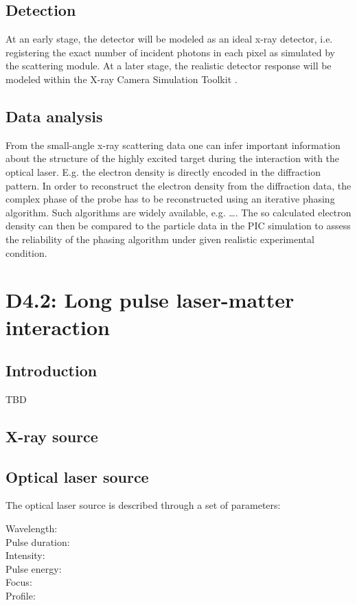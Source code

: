 \documentclass[a4paper]{article}
\begin{document}
\subsection{Detection}
At an early stage, the detector will be modeled as an ideal x-ray detector, i.e. registering the exact number of incident photons in each
pixel as simulated by the scattering module. At a later stage, the realistic detector response will be modeled within the
X-ray Camera Simulation Toolkit \cite{Joy2015}.%
%
\subsection{Data analysis}
From the small-angle x-ray scattering data one can infer important information about the structure of the highly excited target during
the interaction with the optical laser. E.g. the electron density is directly encoded in the diffraction pattern. In order to
reconstruct the electron density from the diffraction data, the complex phase of the probe has to be reconstructed using an iterative phasing
algorithm. Such algorithms are widely available, e.g. \ldots {}.
The so calculated electron density can then be compared to the particle data in the PIC simulation to assess the reliability of
the phasing algorithm under given realistic experimental condition. 

\section{D4.2: Long pulse laser-matter interaction\label{sec:long_pulse}}
\subsection{Introduction}
TBD
\subsection{X-ray source}
\subsection{Optical laser source}
The optical laser source is described through a set of parameters:
\begin{description}
  \item[Wavelength:]
  \item[Pulse duration:]
  \item[Intensity:]
  \item[Pulse energy:]
  \item[Focus:]
  \item[Profile:]
\end{description}
\end{document}
